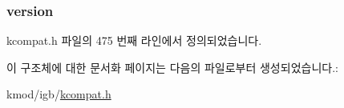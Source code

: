 \subsubsection[{\texorpdfstring{version}{version}}]{ version}\hypertarget{struct__kc__ethtool__regs_a27e145a61d04f0b4ff50793581d143a1}{}\label{struct__kc__ethtool__regs_a27e145a61d04f0b4ff50793581d143a1}


kcompat.\+h 파일의 475 번째 라인에서 정의되었습니다.



이 구조체에 대한 문서화 페이지는 다음의 파일로부터 생성되었습니다.\+:\begin{DoxyCompactItemize}
\item 
kmod/igb/\hyperlink{kcompat_8h}{kcompat.\+h}\end{DoxyCompactItemize}
